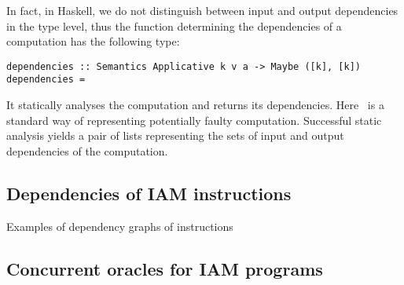 In fact, in Haskell, we do not distinguish between input and output dependencies
in the type level, thus the function determining the dependencies of a computation
has the following type:

\begin{verbatim}
dependencies :: Semantics Applicative k v a -> Maybe ([k], [k])
dependencies =
\end{verbatim}

It statically analyses the computation and returns its dependencies.
Here~
is a standard way of representing potentially faulty computation.
Successful static analysis yields a pair of lists representing the sets of
input and output dependencies of the computation.

\subsection{Dependencies of IAM instructions}

Examples of dependency graphs of instructions

\subsection{Concurrent oracles for IAM programs}


